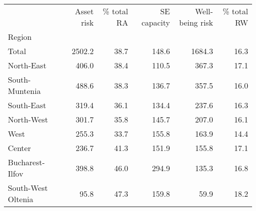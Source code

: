 \begin{tabular}{lrrrrr}
\toprule
{} &  Asset risk &  \% total RA &  SE capacity &  Well-being risk &  \% total RW \\
Region             &             &             &              &                  &             \\
\midrule
Total              &      2502.2 &        38.7 &        148.6 &           1684.3 &        16.3 \\
North-East         &       406.0 &        38.4 &        110.5 &            367.3 &        17.1 \\
South-Muntenia     &       488.6 &        38.3 &        136.7 &            357.5 &        16.0 \\
South-East         &       319.4 &        36.1 &        134.4 &            237.6 &        16.3 \\
North-West         &       301.7 &        35.8 &        145.7 &            207.0 &        16.1 \\
West               &       255.3 &        33.7 &        155.8 &            163.9 &        14.4 \\
Center             &       236.7 &        41.3 &        151.9 &            155.8 &        17.1 \\
Bucharest-Ilfov    &       398.8 &        46.0 &        294.9 &            135.3 &        16.8 \\
South-West Oltenia &        95.8 &        47.3 &        159.8 &             59.9 &        18.2 \\
\bottomrule
\end{tabular}
